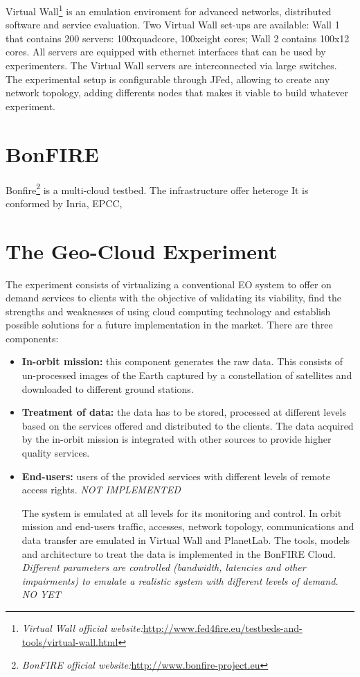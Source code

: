 Virtual Wall\footnote{\emph{Virtual Wall official
    website:}\url{http://www.fed4fire.eu/testbeds-and-tools/virtual-wall.html}} is an emulation enviroment for advanced
networks, distributed software and service evaluation. Two Virtual Wall set-ups
are available: Wall 1 that contains 200 servers: 100xquadcore, 100xeight cores;
Wall 2 contains 100x12 cores. All servers are equipped with ethernet interfaces
that can be used by experimenters. The Virtual Wall servers are interconnected
via large switches. The experimental setup is configurable through JFed, allowing to
create any network topology, adding differents nodes that makes it viable to
build whatever experiment.

\section{BonFIRE}

Bonfire\footnote{\emph{BonFIRE official
    website:}\url{http://www.bonfire-project.eu}} is a multi-cloud testbed. The
infrastructure offer heteroge It is conformed by Inria, EPCC, 



\section{The Geo-Cloud Experiment}

The experiment consists of virtualizing a conventional EO system to offer on
demand services to clients with the objective of validating its viability, find
the strengths and weaknesses of using cloud computing technology and establish
possible solutions for a future implementation in the market. There are three
components:
\begin{itemize}
\item \textbf{In-orbit mission:} this component generates the raw data. This
  consists of un-processed images of the Earth captured by a constellation of 
  satellites and downloaded to different ground stations. 
\item \textbf{Treatment of data:} the data has to be stored, processed at different levels based on the services offered and distributed to the clients. The data acquired by the in-orbit mission is integrated with other sources to provide higher quality services.
\item \textbf{End-users:} users of the provided services with different levels
  of remote access rights. {\emph{NOT IMPLEMENTED}}

The system is emulated at all levels for its monitoring and control. In orbit
mission and end-users traffic, accesses, network topology, communications and
data transfer are emulated in Virtual Wall and PlanetLab. The tools, models and
architecture to treat the data is implemented in the BonFIRE
Cloud. \emph{Different parameters are controlled (bandwidth, latencies and other
  impairments) to emulate a realistic system with different levels of demand. NO
YET
}
\end{itemize}


